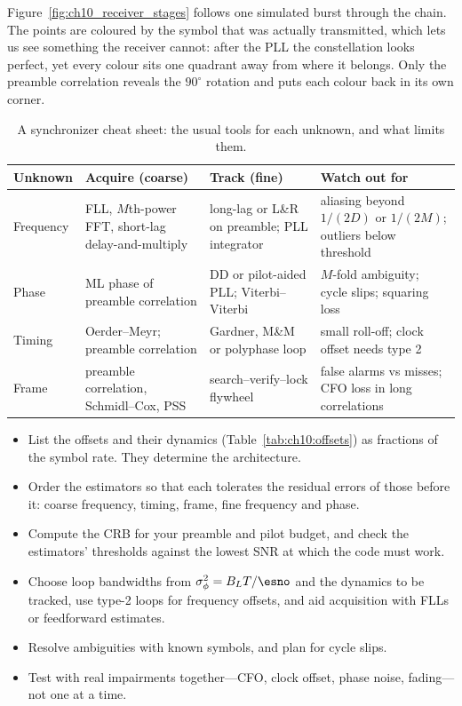Figure~\ref{fig:ch10_receiver_stages} follows one simulated burst through the chain. The points
are coloured by the symbol that was actually transmitted, which lets us see something the receiver
cannot: after the PLL the constellation looks perfect, yet every colour sits one quadrant away from
where it belongs. Only the preamble correlation reveals the $90^\circ$ rotation and puts each
colour back in its own corner.

\begin{table}[htbp]\centering\small
\caption{A synchronizer cheat sheet: the usual tools for each unknown, and what limits them.}
\label{tab:ch10:cheatsheet}
\begin{tabular}{>{\raggedright\arraybackslash}p{1.9cm}>{\raggedright\arraybackslash}p{3.6cm}>{\raggedright\arraybackslash}p{3.6cm}>{\raggedright\arraybackslash}p{3.6cm}}
\toprule
Unknown & Acquire (coarse) & Track (fine) & Watch out for \\
\midrule
Frequency & FLL, $M$th-power FFT, short-lag delay-and-multiply & long-lag or L\&R on preamble; PLL integrator & aliasing beyond $1/(2D)$ or $1/(2M)$; outliers below threshold \\
Phase & ML phase of preamble correlation & DD or pilot-aided PLL; Viterbi--Viterbi & $M$-fold ambiguity; cycle slips; squaring loss \\
Timing & Oerder--Meyr; preamble correlation & Gardner, M\&M or polyphase loop & small roll-off; clock offset needs type 2 \\
Frame & preamble correlation, Schmidl--Cox, PSS & search--verify--lock flywheel & false alarms vs misses; CFO loss in long correlations \\
\bottomrule
\end{tabular}
\end{table}

\begin{keyidea}
\begin{itemize}
\item List the offsets and their dynamics (Table~\ref{tab:ch10:offsets}) as fractions of the symbol
rate. They determine the architecture.
\item Order the estimators so that each tolerates the residual errors of those before it:
coarse frequency, timing, frame, fine frequency and phase.
\item Compute the CRB for your preamble and pilot budget, and check the estimators' thresholds
against the lowest SNR at which the code must work.
\item Choose loop bandwidths from $\sigma_\phi^2=B_LT/\esno$ and the dynamics to be tracked, use
type-2 loops for frequency offsets, and aid acquisition with FLLs or feedforward estimates.
\item Resolve ambiguities with known symbols, and plan for cycle slips.
\item Test with real impairments together---CFO, clock offset, phase noise, fading---not one at a
time.
\end{itemize}
\end{keyidea}

